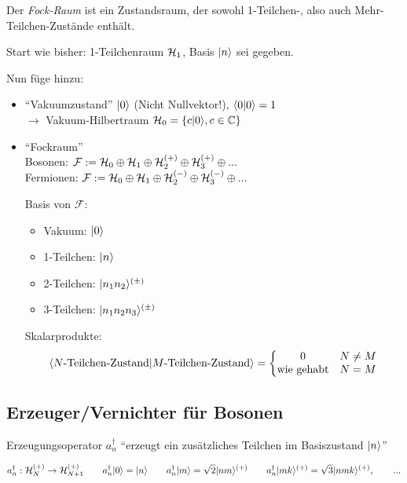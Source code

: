 \documentclass[11pt,a4paper]{report}
\begin{document}
Der \textit{Fock-Raum} ist ein Zustandsraum, der sowohl 1-Teilchen-, also auch Mehr-Teilchen-Zustände enthält.\par 

Start wie bisher: 1-Teilchenraum $\mathcal{H}_1$, Basis $|n\rangle$ sei gegeben.\par 

\newcommand{\fock}{\mathcal{F}}

Nun füge hinzu:
\begin{itemize}
\item ``Vakuumzustand'' $|0\rangle$ (Nicht Nullvektor!), $\langle 0 | 0 \rangle = 1$\\
$\rightarrow$ Vakuum-Hilbertraum $\mathcal{H}_0 = \{ c|0\rangle , c\in\mathbb{C}\}$
\item ``Fockraum''\\
Bosonen: $\fock:=\hil_0 \oplus \hil_1 \oplus \hil_2^{(+)} \oplus \hil_3^{(+)} \oplus ... $\\
Fermionen: $\fock:=\hil_0 \oplus \hil_1 \oplus \hil_2^{(-)} \oplus \hil_3^{(-)} \oplus ... $\par 

Basis von $\fock$:
\begin{itemize}
\item Vakuum: $|0\rangle$
\item 1-Teilchen: $|n\rangle$
\item 2-Teilchen: $|n_1n_2\rangle^{(\pm )}$
\item 3-Teilchen: $|n_1n_2n_3\rangle^{(\pm )}$
\end{itemize}

Skalarprodukte:
$$\langle N\text{-Teilchen-Zustand} | M\text{-Teilchen-Zustand} \rangle = \left\{ \begin{matrix}
0 & N\neq M \\
\text{wie gehabt} & N=M
\end{matrix}\right. $$

\end{itemize}

\subsection{Erzeuger/Vernichter für Bosonen}

Erzeugungsoperator $a_n^\dagger$ ``erzeugt ein zusätzliches Teilchen im Basiszustand $|n\rangle$''

$$a_n^\dagger : \mathcal{H}_N^{(+)}\rightarrow \mathcal{H}_{N+1}^{(+)} \qquad a_n^\dagger|0\rangle = |n\rangle\qquad a_n^\dagger|m\rangle = \sqrt{2}|nm\rangle^{(+)} \qquad a_n^\dagger|mk\rangle^{(+)}=\sqrt{3}|nmk\rangle^{(+)}, \qquad ...$$
\end{document}
